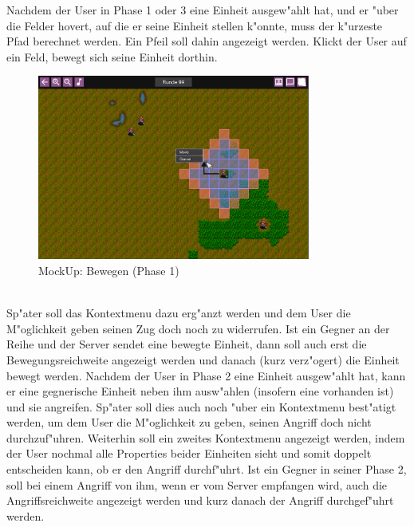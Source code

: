 \documentclass[12pt, titlepage]{scrartcl}
\newcounter{subsubsubsection}[subsubsection]
\begin{document}
                    Nachdem der User in Phase 1 oder 3 eine Einheit ausgew"ahlt hat, und er "uber die Felder hovert, auf die er seine Einheit stellen k"onnte, muss der k"urzeste Pfad berechnet werden. Ein Pfeil soll dahin angezeigt werden. Klickt der User auf ein Feld, bewegt sich seine Einheit dorthin. \\
                    \begin{figure}[H] 
    				    \centering
    				    \includegraphics[width=0.8\textwidth]{images/mockUps/Move.png}
    				    \caption{MockUp: Bewegen (Phase 1)}
    				    \label{Move}
			        \end{figure}
                    \ \\ Sp"ater soll das Kontextmenu dazu erg"anzt werden und dem User die M"oglichkeit geben seinen Zug doch noch zu widerrufen. Ist ein Gegner an der Reihe und der Server sendet eine bewegte Einheit, dann soll auch erst die Bewegungsreichweite angezeigt werden und danach (kurz verz"ogert) die Einheit bewegt werden.
			        Nachdem der User in Phase 2 eine Einheit ausgew"ahlt hat, kann er eine gegnerische Einheit neben ihm ausw"ahlen (insofern eine vorhanden ist) und sie angreifen. Sp"ater soll dies auch noch "uber ein Kontextmenu best"atigt werden, um dem User die M"oglichkeit zu geben, seinen Angriff doch nicht durchzuf"uhren. Weiterhin soll ein zweites Kontextmenu angezeigt werden, indem der User nochmal alle Properties beider Einheiten sieht und somit doppelt entscheiden kann, ob er den Angriff durchf"uhrt. Ist ein Gegner in seiner Phase 2, soll bei einem Angriff von ihm, wenn er vom Server empfangen wird, auch die Angriffsreichweite angezeigt werden und kurz danach der Angriff durchgef"uhrt werden.
\end{document}
